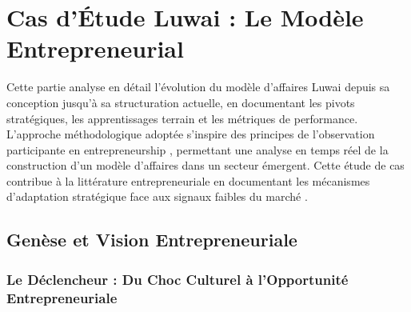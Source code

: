 \chapter{Cas d'Étude Luwai : Le Modèle Entrepreneurial}
\label{chap:luwai_case_study}

Cette partie analyse en détail l'évolution du modèle d'affaires Luwai depuis sa conception jusqu'à sa structuration actuelle, en documentant les pivots stratégiques, les apprentissages terrain et les métriques de performance. L'approche méthodologique adoptée s'inspire des principes de l'observation participante en entrepreneurship \cite{gartner1985conceptual}, permettant une analyse en temps réel de la construction d'un modèle d'affaires dans un secteur émergent. Cette étude de cas contribue à la littérature entrepreneuriale en documentant les mécanismes d'adaptation stratégique face aux signaux faibles du marché \cite{eisenhardt1989building}.

\section{Genèse et Vision Entrepreneuriale}

\subsection{Le Déclencheur : Du Choc Culturel à l'Opportunité Entrepreneuriale}

